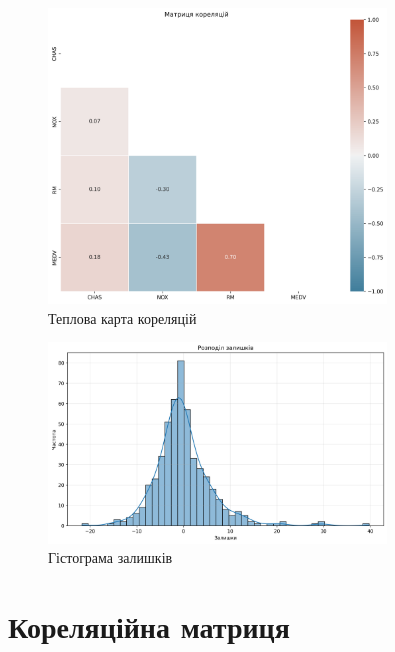 \documentclass{article}
\begin{document}
    \vspace{0.5cm}
    
    \begin{figure}[H]
        \centering
        \includegraphics[width=0.8\textwidth]{correlation_heatmap.png}
        \caption{Теплова карта кореляцій}
        \label{fig:теплова_карта_кореляцій}
    \end{figure}

    \vspace{0.5cm}
    
    \begin{figure}[H]
        \centering
        \includegraphics[width=0.8\textwidth]{residuals_hist.png}
        \caption{Гістограма залишків}
        \label{fig:гістограма_залишків}
    \end{figure}

    \vspace{0.5cm}
    
    \section{Кореляційна матриця}
\end{document}
